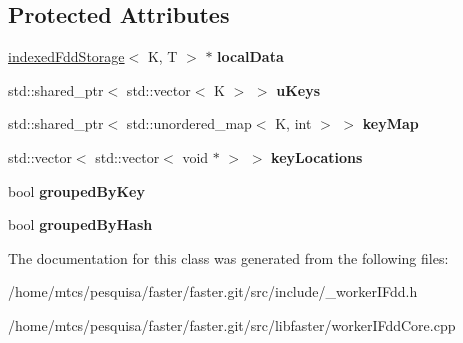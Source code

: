 \subsection*{Protected Attributes}
\begin{DoxyCompactItemize}
\item 
\hypertarget{classfaster_1_1workerIFddCore_a6bd0d4cb57e817b78276c1442bc74441}{}\label{classfaster_1_1workerIFddCore_a6bd0d4cb57e817b78276c1442bc74441} 
\hyperlink{classfaster_1_1indexedFddStorage}{indexed\+Fdd\+Storage}$<$ K, T $>$ $\ast$ {\bfseries local\+Data}
\item 
\hypertarget{classfaster_1_1workerIFddCore_a508d9ad0781f75587ae2ac64dc5172e5}{}\label{classfaster_1_1workerIFddCore_a508d9ad0781f75587ae2ac64dc5172e5} 
std\+::shared\+\_\+ptr$<$ std\+::vector$<$ K $>$ $>$ {\bfseries u\+Keys}
\item 
\hypertarget{classfaster_1_1workerIFddCore_a40f9f1980fb9360e1849582f9a46fa5d}{}\label{classfaster_1_1workerIFddCore_a40f9f1980fb9360e1849582f9a46fa5d} 
std\+::shared\+\_\+ptr$<$ std\+::unordered\+\_\+map$<$ K, int $>$ $>$ {\bfseries key\+Map}
\item 
\hypertarget{classfaster_1_1workerIFddCore_a0aae335b6c84d8927e04a486f9957ad1}{}\label{classfaster_1_1workerIFddCore_a0aae335b6c84d8927e04a486f9957ad1} 
std\+::vector$<$ std\+::vector$<$ void $\ast$ $>$ $>$ {\bfseries key\+Locations}
\item 
\hypertarget{classfaster_1_1workerIFddCore_a6545ef59d553976a05da0c7790264fd1}{}\label{classfaster_1_1workerIFddCore_a6545ef59d553976a05da0c7790264fd1} 
bool {\bfseries grouped\+By\+Key}
\item 
\hypertarget{classfaster_1_1workerIFddCore_a4e98555446fe05351079bdc1c34404fa}{}\label{classfaster_1_1workerIFddCore_a4e98555446fe05351079bdc1c34404fa} 
bool {\bfseries grouped\+By\+Hash}
\end{DoxyCompactItemize}


The documentation for this class was generated from the following files\+:\begin{DoxyCompactItemize}
\item 
/home/mtcs/pesquisa/faster/faster.\+git/src/include/\+\_\+worker\+I\+Fdd.\+h\item 
/home/mtcs/pesquisa/faster/faster.\+git/src/libfaster/worker\+I\+Fdd\+Core.\+cpp\end{DoxyCompactItemize}
